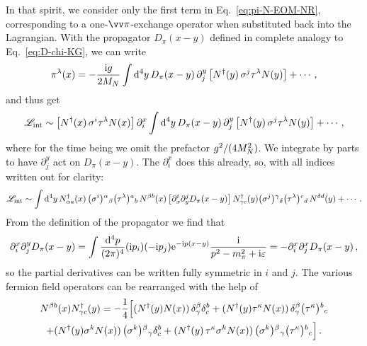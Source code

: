 In that spirit, we consider only the first term in Eq.~\eqref{eq:pi-N-EOM-NR},
corresponding to a one-$\skvec{\pi}$-exchange operator when substituted back 
into the Lagrangian.  With the propagator $D_\pi(x-y)$ defined in complete 
analogy to Eq.~\eqref{eq:D-chi-KG}, we can write
%
\begin{equation}
 \pi^\lambda(x) = {-}\frac{\mathrm{i} g}{2M_N} \int\mathrm{d}^4y \, D_\pi(x-y)
 \, \partial_j^y \left[N^\dagger(y)\,{\sigma^j}\tau^\lambda N(y)\right]
 + \cdots \,,
\end{equation}
%
and thus get
%
\begin{equation}
 \mathcal{L}_\text{int}
 \sim \left[N^\dagger(x)\,\sigma^i\tau^\lambda N(x)\right]
 \partial_i^x \int\mathrm{d}^4y \, D_\pi(x-y)
 \, \partial_j^y \left[N^\dagger(y)\,\sigma^j\tau^\lambda N(y)\right]
 + \cdots \,,
\end{equation}
%
where for the time being we omit the prefactor ${g^2}/{(4M_N^2)}$.  We 
integrate by parts to have $\partial_j^y$ act on $D_\pi(x-y)$.  The 
$\partial_i^x$ does this already, so, with all indices written out for clarity:
%
\begin{multline}
 \LL_\text{int} \sim \int\dd^4y \,
 N^\dagger_{\alpha a}(x)\, \idxx{\sigma^i}{\alpha}{\beta}
 \idxx{\tau^\lambda}{a}{b} \, N^{\beta b}(x)
 \left[\partial_x^i \partial_y^j D_\pi(x-y) \right]
 N^\dagger_{\gamma c}(y) \idxx{\sigma^j}{\gamma}{\delta}
 \idxx{\tau^\lambda}{c}{d} \, N^{\delta d}(y)
 + \cdots \,.
\label{eq:L-pi-N-Dpi}
\end{multline}
%
From the definition of the propagator we find that
%
\begin{equation}
 \partial^x_i \partial^y_j D_\pi(x-y)
 = \int\frac{\dd^4p}{(2\pi)^4} (\ii p_i)({-}\ii p_j) \eex^{{-}\ii p(x-y)}
 \frac{\ii}{p^2-\mpi^2 + \ii\eps} 
 = {-}\partial^x_i \partial^x_j D_\pi(x-y) \,,
\label{eq:D-pi-partial}
\end{equation}
%
so the partial derivatives can be written fully symmetric in $i$ and $j$.  The 
various fermion field operators can be rearranged with the help of
%
\begin{multline}
 N^{\beta b}(x) N^\dagger_{\gamma c}(y)
 = {-}\frac{1}{4}\Big[
 (N^\dagger(y) N(x))\,\delta^\beta_\gamma \delta^b_c
 + (N^\dagger(y) \tau^\kappa N(x))
 \,\delta^\beta_\gamma \idxx{\tau^\kappa}{b}{c} \\
 + (N^\dagger(y) \sigma^k N(x))\,\idxx{\sigma^k}{\beta}{\gamma} \delta^b_c
 + (N^\dagger(y)\,\tau^\kappa\sigma^k N(x)) \,
 \idxx{\sigma^k}{\beta}{\gamma}\idxx{\tau^\kappa}{b}{c} \Big] \,.
\label{eq:NN-Fierz}
\end{multline}
